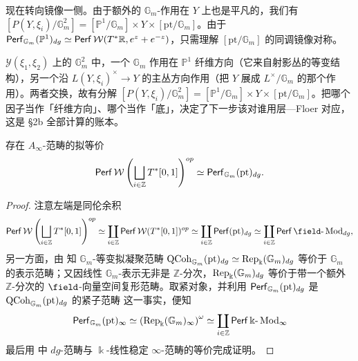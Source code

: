 现在转向镜像一侧。由于额外的 $\mathbb{G}_m$-作用在 $Y$ 上也是平凡的，我们有 $[P(Y,\xi_i)/\mathbb{G}_m^2]=[\mathbb{P}^1/\mathbb{G}_m]\times Y\times [\mathrm{pt}/\mathbb{G}_m]$。由于 $\operatorname{\mathsf{Perf}}_{\mathbb{G}_m} (\mathbb{P}^1)_{dg}\simeq\operatorname{\mathsf{Perf}}\mathcal{W} (T^{\ast}\mathbb{R},e^z+e^{-z})$，只需理解 $[\mathrm{pt}/\mathbb{G}_m]$ 的同调镜像对称。

\begin{yizhu}
$\mathcal{Y}(\xi_1,\xi_2)$ 上的 $\mathbb{G}_m^2$ 中，一个 $\mathbb{G}_m$ 作用在 $\mathbb{P}^1$ 纤维方向（它来自射影丛的等变结构），另一个沿 $L(Y,\xi_i)^{\times}\to Y$ 的主丛方向作用（把 $Y$ 展成 $L^{\times}/\mathbb{G}_m$ 的那个作用）。两者交换，故有分解 $[P(Y,\xi_i)/\mathbb{G}_m^2]=[\mathbb{P}^1/\mathbb{G}_m]\times Y\times[\mathrm{pt}/\mathbb{G}_m]$。把哪个因子当作「纤维方向」、哪个当作「底」，决定了下一步该对谁用层—Floer 对应，这是 §2b 全部计算的账本。
\end{yizhu}

\begin{lmm}
    存在 $A_{\infty}$-范畴的拟等价 \[
        \operatorname{\mathsf{Perf}}\mathcal{W}\left(\bigsqcup_{i\in\mathbb{Z}}T^{\ast}[0,1]\right)^{op}\simeq\operatorname{\mathsf{Perf}}_{\mathbb{G}_m} (\mathrm{pt})_{dg}.
    \]
\end{lmm}
\begin{proof}
    注意左端是同伦余积 \[
       \Perf \mathcal{W}\left(\bigsqcup_{i\in\mathbb{Z}}T^{\ast} [0,1]\right)^{op}\simeq\coprod_{i\in\mathbb{Z}}\Perf\mathcal{W} (T^{\ast} [0,1])^{op}\simeq \coprod_{i\in\mathbb{Z}}\Perf (\mathrm{pt})_{dg}\simeq\coprod_{i\in\mathbb{Z}}\Perf\field\text{-}\Mod_{dg},
    \]另一方面，由 \cite[Proposition 4.9]{TV18} 知 $\mathbb{G}_m$-等变拟凝聚范畴 $\operatorname{\mathrm{QCoh}}_{\mathbb{G}_m} (\mathrm{pt})_{dg}\simeq\operatorname{Rep}_{\Bbbk} (\mathbb{G}_m)_{dg}$ 等价于 $\mathbb{G}_m$ 的表示范畴；又因线性 $\mathbb{G}_m$-表示无非是 $\mathbb{Z}$-分次，$\operatorname{Rep}_{\Bbbk} (\mathbb{G}_m)_{dg}$ 等价于带一个额外 $\mathbb{Z}$-分次的 $\field$-向量空间复形范畴。取紧对象，并利用 $\operatorname{\mathsf{Perf}}_{\mathbb{G}_m} (\mathrm{pt})_{dg}$ 是 $\operatorname{\mathrm{QCoh}}_{\mathbb{G}_m} (\mathrm{pt})_{dg}$ 的紧子范畴 \cite{BZFN10} 这一事实，便知 \[
        \operatorname{\mathsf{Perf}}_{\mathbb{G}_m} (\mathrm{pt})_{\infty}\simeq\left(\operatorname{Rep}_{\Bbbk} (\mathbb{G}_m)_{\infty}\right)^{\omega}\simeq\coprod_{i\in\mathbb{Z}}\operatorname{\mathsf{Perf}}\Bbbk\text{-}\operatorname{\mathrm{Mod}}_{\infty}
    \]最后用 \cite{Cohn16} 中 $dg$-范畴与 $\Bbbk$-线性稳定 $\infty$-范畴的等价完成证明。
\end{proof}


